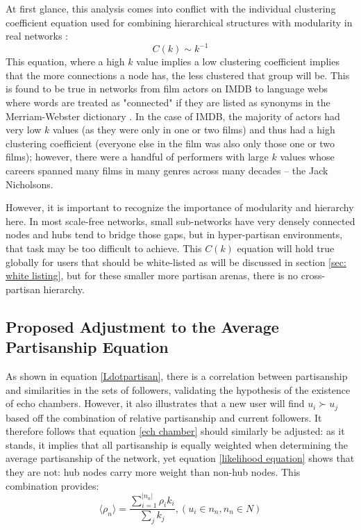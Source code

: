 \documentclass[preprint,review,12pt]{elsarticle}
\begin{document}
At first glance, this analysis comes into conflict with the individual clustering coefficient equation used for combining hierarchical structures with modularity in real networks \cite{ravasz2003hierarchical,dorogovtsev2008critical,dorogovtsev2002pseudofractal}:
\begin{equation}
\label{hierarchy equation}
    C(k) \sim k^{-1}
\end{equation}
This equation, where a high $k$ value implies a low clustering coefficient implies that the more connections a node has, the less clustered that group will be. This is found to be true in networks from film actors on IMDB \cite{amaral2000classes,albert2000topology,barabasi1999emergence} to language webs where words are treated as "connected" if they are listed as synonyms in the Merriam-Webster dictionary \cite{sole2001small,yook2002modeling,sigman2002global,dorogovtsev2001language}. In the case of IMDB, the majority of actors had very low $k$ values (as they were only in one or two films) and thus had a high clustering coefficient (everyone else in the film was also only those one or two films); however, there were a handful of performers with large $k$ values whose careers spanned many films in many genres across many decades -- the Jack Nicholsons. 

However, it is important to recognize the importance of modularity and hierarchy here. In most scale-free networks, small sub-networks have very densely connected nodes and hubs tend to bridge those gaps, but in hyper-partisan environments, that task may be too difficult to achieve. This $C(k)$ equation will hold true globally for users that should be white-listed as will be discussed in section \ref{sec: white listing}, but for these smaller more partisan arenas, there is no cross-partisan hierarchy. 

\subsection{Proposed Adjustment to the Average Partisanship Equation}
As shown in equation \ref{Ldotpartisan}, there is a correlation between partisanship and similarities in the sets of followers, validating the hypothesis of the existence of echo chambers. However, it also illustrates that a new user will find $u_i \succ u_j$ based off the combination of relative partisanship and current followers. It therefore follows that equation \ref{ech chamber} should similarly be adjusted: as it stands, it implies that all partisanship is equally weighted when determining the average partisanship of the network, yet equation \ref{likelihood equation} shows that they are not: hub nodes carry more weight than non-hub nodes. This combination provides:
\begin{equation}
    \label{echo chamber by followers}
        \langle \rho_n \rangle = \frac{\sum_{i=1}^{|n_n|}\rho_ik_i}{\sum_{j}k_j}, (u_i \in n_n, n_n \in N)
 \end{equation}
 
\end{document}
